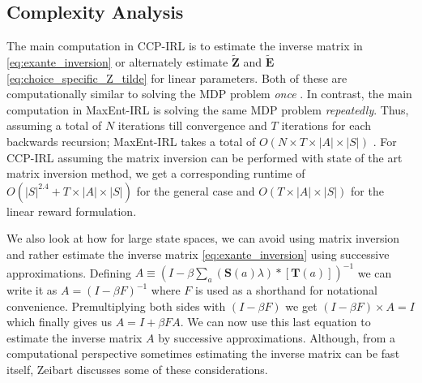 \documentclass{article}
\begin{document}



\subsection{Complexity Analysis}
The main computation in CCP-IRL is to estimate the inverse matrix in \eqref{eq:exante_inversion} or alternately estimate $\tilde{\mathbf{Z}}$ and $\tilde{\mathbf{E}}$ \eqref{eq:choice_specific_Z_tilde} for linear parameters. Both of these are computationally similar to solving the MDP problem \emph{once} \cite{puterman}. 
In contrast, the main computation in MaxEnt-IRL is solving the same MDP problem \emph{repeatedly}.
Thus, assuming a total of $N$ iterations till convergence and $T$ iterations for each backwards recursion; MaxEnt-IRL takes a total of $O(N\times T \times|A|\times|S|)$ \cite{ziebart_phd}. For CCP-IRL assuming the matrix inversion can be performed with state of the art matrix inversion method, we get a corresponding runtime of $O(|S|^{2.4}+T\times|A|\times|S|)$ for the general case and $O(T\times|A|\times|S|)$ for the linear reward formulation.

We also look at how for large state spaces, we can avoid using matrix inversion and rather estimate the inverse matrix \eqref{eq:exante_inversion} using successive approximations.
Defining $A \equiv \left(I- \beta \sum_{a}(\mathbf{S}(a) \lambda) *\left[ \mathbf{T}(a)  \right]\right)^{-1}$ we can write it as $A = (I - \beta F)^{-1}$ where $F$ is used as a shorthand for notational convenience. Premultiplying both sides with $(I - \beta F)$ we get $(I - \beta F)\times A = I$ which finally gives us $A = I + \beta F A$. We can now use this last equation to estimate the inverse matrix $A$ by successive approximations. Although, from a computational perspective sometimes estimating the inverse matrix can be fast itself, Zeibart  discusses some of these considerations.
\end{document}
